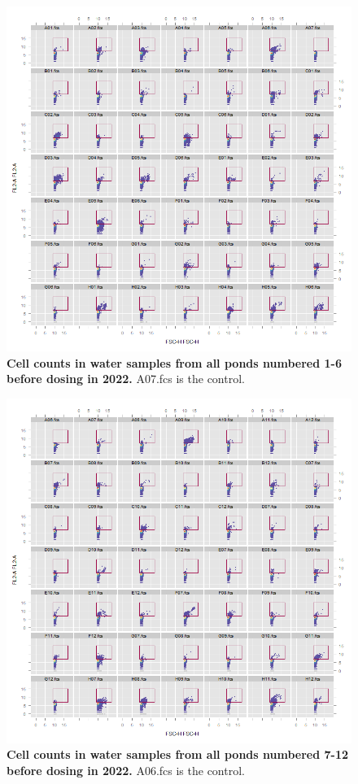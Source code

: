 \begin{figure}[H]
    \centering
    \includegraphics[scale=0.6]{./Figures/20220420_1_6}
    \caption{\textbf{Cell counts in water samples from all ponds numbered 1-6 before dosing in 2022.} A07.fcs is the control.}
    \label{fig:fc2022_pre_1_6}
\end{figure}

\begin{figure}[H]
    \centering
    \includegraphics[scale=0.6]{./Figures/20220420_7_12}
    \caption{\textbf{Cell counts in water samples from all ponds numbered 7-12 before dosing in 2022.} A06.fcs is the control.}
    \label{fig:fc2022_pre_7_12}
\end{figure}

